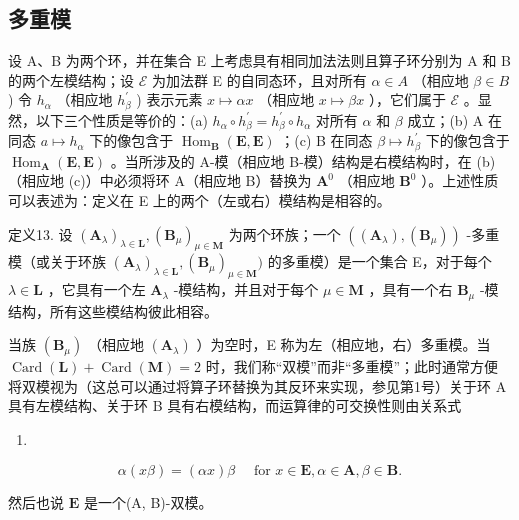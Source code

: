 \subsection{多重模}

设 A、B 为两个环，并在集合 E 上考虑具有相同加法法则且算子环分别为 A 和 B 的两个左模结构；设 \(\mathcal{E}\) 为加法群 E 的自同态环，且对所有 \(\alpha \in A\) （相应地 \(\beta \in B\) ) 令 \(h_{\alpha}\) （相应地 \(h_{\beta}^{\prime}\) ) 表示元素 \(x \mapsto \alpha x\) （相应地 \(x \mapsto \beta x\) ），它们属于 \(\mathcal{E}\) 。显然，以下三个性质是等价的：(a) \(h_{\alpha} \circ h_{\beta}^{\prime} = h_{\beta}^{\prime} \circ h_{\alpha}\) 对所有 \(\alpha\) 和 \(\beta\) 成立；(b) A 在同态 \(a \mapsto h_{\alpha}\) 下的像包含于 \(\operatorname{Hom}_{\mathbf{B}}(\mathbf{E}, \mathbf{E})\) ；(c) B 在同态 \(\beta \mapsto h_{\beta}^{\prime}\) 下的像包含于 \(\operatorname{Hom}_{\mathbf{A}}(\mathbf{E}, \mathbf{E})\) 。当所涉及的 A-模（相应地 B-模）结构是右模结构时，在 (b)（相应地 (c)）中必须将环 A（相应地 B）替换为 \(\mathbf{A}^{0}\) （相应地 \(\mathbf{B}^{0}\) ）。上述性质可以表述为：定义在 E 上的两个（左或右）模结构是相容的。

定义13. 设 \((\mathbf{A}_{\lambda})_{\lambda \in \mathbf{L}}, (\mathbf{B}_{\mu})_{\mu \in \mathbf{M}}\) 为两个环族；一个 \(((\mathbf{A}_{\lambda}), (\mathbf{B}_{\mu}))\) -多重模（或关于环族 \((\mathbf{A}_{\lambda})_{\lambda \in \mathbf{L}}, (\mathbf{B}_{\mu})_{\mu \in \mathbf{M}})\) 的多重模）是一个集合 E，对于每个 \(\lambda \in \mathbf{L}\) ，它具有一个左 \(\mathbf{A}_{\lambda}\) -模结构，并且对于每个 \(\mu \in \mathbf{M}\) ，具有一个右 \(\mathbf{B}_{\mu}\) -模结构，所有这些模结构彼此相容。

当族 \((\mathbf{B}_{\mu})\) （相应地 \((\mathbf{A}_{\lambda})\) ）为空时，E 称为左（相应地，右）多重模。当 \(\operatorname{Card}(\mathbf{L}) + \operatorname{Card}(\mathbf{M}) = 2\) 时，我们称“双模”而非“多重模”；此时通常方便将双模视为（这总可以通过将算子环替换为其反环来实现，参见第1号）关于环 A 具有左模结构、关于环 B 具有右模结构，而运算律的可交换性则由关系式

\begin{enumerate}
\def\labelenumi{(\arabic{enumi})}
\setcounter{enumi}{48}
\tightlist
\item
\end{enumerate}

\[
\alpha (x \beta) = (\alpha x) \beta \quad \text { for } x \in \mathbf {E}, \alpha \in \mathbf {A}, \beta \in \mathbf {B}.
\]

然后也说 \(\mathbf{E}\) 是一个(A, B)-双模。

